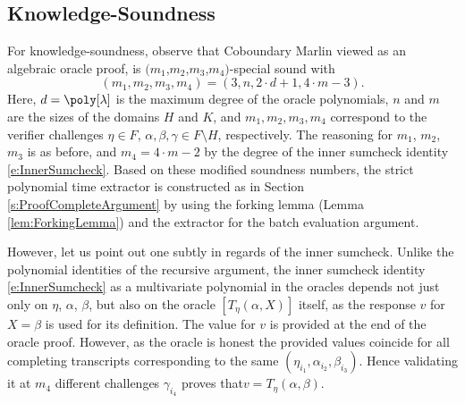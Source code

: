 \documentclass[10pt,article,oneside]{memoir}
\theoremstyle{definition}
\theoremstyle{remark}
\begin{document}
\subsection{Knowledge-Soundness}
For knowledge-soundness, observe that Coboundary Marlin viewed as an algebraic oracle proof, is $(m_1$,$m_2$,$m_3$,$m_4)$-special sound with
\[
(m_1,m_2,m_3,m_4) = (3, n, 2\cdot d+1,4\cdot m - 3).
\]
Here, $d=\poly[\lambda]$ is the maximum degree of the oracle polynomials, $n$ and $m$ are the sizes of the domains $H$ and $K$, and $m_1,m_2,m_3,m_4$ correspond to the verifier challenges $\eta\in F$, $\alpha, \beta, \gamma \in F\setminus H$, respectively.
The reasoning for $m_1$, $m_2$, $m_3$ is as before, and $m_4=4\cdot m - 2$ by the degree of the inner sumcheck identity \eqref{e:InnerSumcheck}. 
Based on these modified soundness numbers, the strict polynomial time extractor is constructed as in Section \ref{s:ProofCompleteArgument} by using the forking lemma (Lemma \ref{lem:ForkingLemma}) and the extractor for the batch evaluation argument.

However, let us point out one subtly in regards of the inner sumcheck. 
Unlike the polynomial identities of the recursive argument, the inner sumcheck identity \ref{e:InnerSumcheck} as a multivariate polynomial in the oracles depends not just only on $\eta$, $\alpha$, $\beta$, but also on the oracle $[T_\eta(\alpha,X)]$ itself, as the response $v$ for $X=\beta$ is used for its definition. 
The value for $v$ is provided at the end of the oracle proof.
However, as the oracle is honest the provided values coincide for all completing transcripts corresponding to the same $(\eta_{i_1},\alpha_{i_2},\beta_{i_3})$.
Hence validating it at $m_4$ different challenges $\gamma_{i_4}$ proves that\footnotemark $v= T_{\eta}(\alpha,\beta)$.
\end{document}

